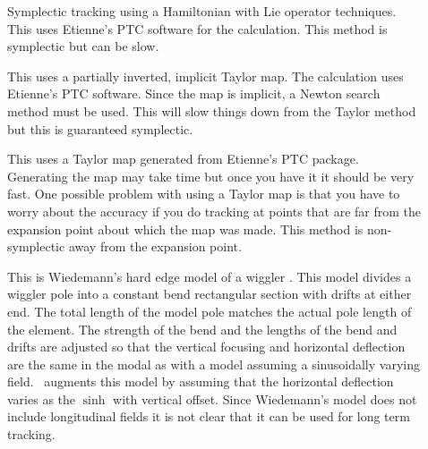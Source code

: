 \begin{description}
\item[]
Symplectic tracking using a Hamiltonian with Lie operator techniques.
This uses Etienne's PTC software for the calculation. This method is
symplectic but can be slow.

\item[]
This uses a partially inverted, implicit Taylor map. The calculation
uses Etienne's PTC software.  Since the map is implicit, a Newton
search method must be used. This will slow things down from the Taylor
method but this is guaranteed symplectic.

\item[]
This uses a Taylor map generated from Etienne's PTC
package. Generating the map may take time but once you have it it
should be very fast. One possible problem with using a Taylor map is
that you have to worry about the accuracy if you do tracking at points
that are far from the expansion point about which the map was
made. This method is non-symplectic away from the expansion point. 

\item[]
This is Wiedemann's hard edge model of a wiggler
\cite{wiedemann}. This model divides a wiggler pole into a constant 
bend rectangular section with drifts at either end. The total length
of the model pole matches the actual pole length of the element. The
strength of the bend and the lengths of the bend and drifts are
adjusted so that the vertical focusing and horizontal deflection are
the same in the modal as with a model assuming a sinusoidally varying
field. \bmad\ augments this model by assuming that the horizontal
deflection varies as the $\sinh$ with vertical offset.  Since
Wiedemann's model does not include longitudinal fields it is not clear
that it can be used for long term tracking.

\end{description}

\vfill \break
{\vfill}

